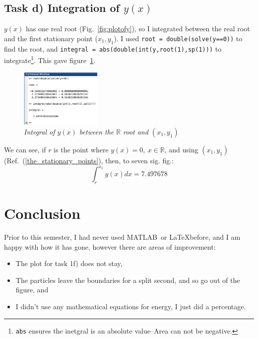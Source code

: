 \documentclass[10pt,a4paper]{article}
\newcommand{\code}[1]{\colorbox{light-gray}{\texttt{#1}}}
\begin{document}
	\subsection{Task d) Integration of $y(x)$} %

	$y(x)$ has one real root (Fig.~\ref{fig:plotofy}), so I integrated between the  real root and the first stationary point ($x_1,y_1$). I used  \code{root = double(solve(y==0))} to find the root, and  \code{integral = abs(double(int(y,root(1),sp(1)))} to integrate\footnote{\code{abs} ensures the inetgral is an absolute value--Area can not be negative.}. This gave figure~\ref{fig_complexroots}.

	\begin{figure}[h!]
		\begin{center}
			\includegraphics[width=0.35\textwidth]{d_screenshot.png}
		\end{center}
		\caption{\label{fig_complexroots}\textit{Integral of $y(x)$ between the $\mathbb{R}$ root and $(x_1,y_1)$}}
	\end{figure}
	We can see, if ${r}$ is the point where $y(x)=0,\ x\in\mathbb{R}$, and using $(x_1,y_1)$ (Ref.~(\ref{the_stationary_points}), then, to seven sig. fig.:
	$$ \int^{x_1}_{r} y(x)dx = 7.497678 $$ 
	
	\section{Conclusion}
	
	Prior to this semester, I had never used MATLAB\textregistered\ or \LaTeX before, and I am happy with how it has gone, however there are areas of improvement:
	\begin{itemize}
		\item The plot for task 1f) does not stay,
		\item The particles leave the boundaries for a split second, and so go out of the figure, and
		\item I didn't use any mathematical equations for energy, I just did a percentage.
	\end{itemize}
	
	
	\pagebreak
\end{document}
